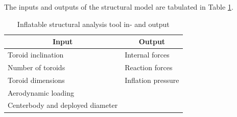 

The inputs and outputs of the structural model are tabulated in Table \ref{tab:infl}.
\begin{table}[h]
\caption{Inflatable structural analysis tool in- and output}
\centering
\begin{tabular}{|l||l|}
\hline
\multicolumn{1}{|c||}{{\bf Input}} & \multicolumn{1}{c|}{{\bf Output}} \\ \hline \hline
Toroid inclination                & Internal forces                   \\ \hline
Number of toroids                 & Reaction forces                   \\ \hline
Toroid dimensions                 & Inflation pressure                \\ \hline
Aerodynamic loading               &                                   \\ \hline
Centerbody and deployed diameter  &                                   \\ \hline
\end{tabular}
\label{tab:infl}
\end{table}

